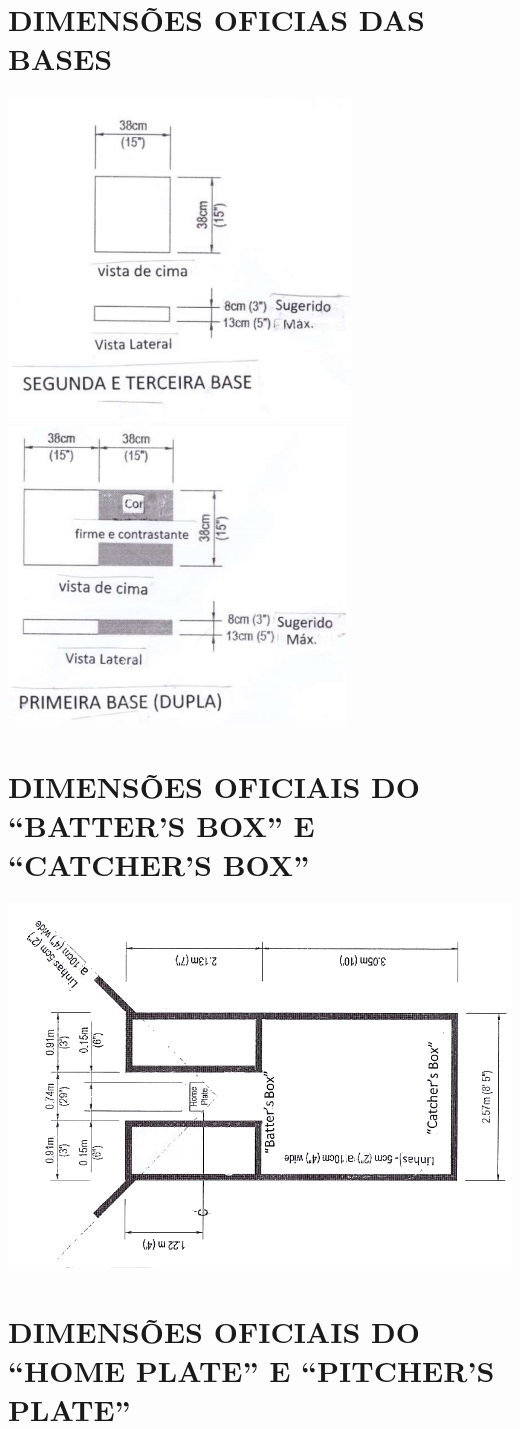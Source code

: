 \section{DIMENSÕES OFICIAS DAS BASES}
{\begin{center}
		\includegraphics[width=.45\textwidth]{fig/base03}
		\includegraphics[width=.45\textwidth]{fig/base01}
\end{center}}

\section{DIMENSÕES OFICIAIS DO “BATTER’S BOX” E “CATCHER’S BOX” }
{\begin{center}
		\includegraphics[width=.50\textwidth,angle=180]{fig/catcherbox}\end{center}}

\section[\textit{Home Plate} \Gls{pitcher's plate}]{DIMENSÕES OFICIAIS DO “HOME PLATE” E “PITCHER’S PLATE”}

